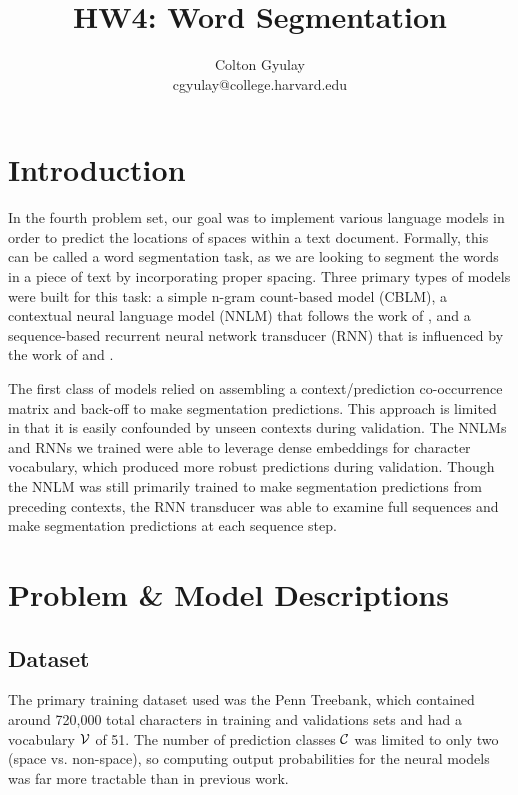 \documentclass[11pt]{article}
\title{HW4: Word Segmentation}
\author{Colton Gyulay \\ cgyulay@college.harvard.edu }
\begin{document}
\maketitle{}
\section{Introduction}

In the fourth problem set, our goal was to implement various language models in order to predict the locations of spaces within a text document. Formally, this can be called a word segmentation task, as we are looking to segment the words in a piece of text by incorporating proper spacing. Three primary types of models were built for this task: a simple n-gram count-based model (CBLM), a contextual neural language model (NNLM) that follows the work of \citet{DBLP:journals/jmlr/BengioDVJ03}, and a sequence-based recurrent neural network transducer (RNN) that is influenced by the work of \citet{DBLP:journals/cogsci/Elman90} and \citet{DBLP:journals/neco/HochreiterS97}.

The first class of models relied on assembling a context/prediction co-occurrence matrix and back-off to make segmentation predictions. This approach is limited in that it is easily confounded by unseen contexts during validation. The NNLMs and RNNs we trained were able to leverage dense embeddings for character vocabulary, which produced more robust predictions during validation. Though the NNLM was still primarily trained to make segmentation predictions from preceding contexts, the RNN transducer was able to examine full sequences and make segmentation predictions at each sequence step.

\section{Problem \& Model Descriptions}

\subsection{Dataset}

The primary training dataset used was the Penn Treebank, which contained around 720,000 total characters in training and validations sets and had a vocabulary $\mathcal{V}$ of 51. The number of prediction classes $\mathcal{C}$ was limited to only two (space vs. non-space), so computing output probabilities for the neural models was far more tractable than in previous work.
\end{document}
